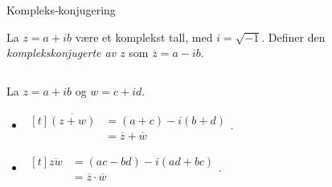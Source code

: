 \documentclass[norsk]{beamer}
\theoremstyle{example}
\begin{document}
\begin{frame}{Kompleks-konjugering}
    \begin{definition}
        La $z = a + ib$ være et komplekst tall, med $i = \sqrt{-1}$.
        Definer den \textit{komplekskonjugerte av $z$} som $\overline z = a - ib$.
    \end{definition}
    \begin{columns}
        \begin{column}{.6\textwidth}
            La $z = a + ib$ og $w = c + id$.
            \begin{itemize}
                \item $\begin{aligned}[t]
                        \overline{(z + w)}
                        &= (a + c) - i(b + d)\\
                        &= \overline z + \overline w
                    \end{aligned}$.
                \pause\item $\begin{aligned}[t]
                        \overline{zw}
                        &= (ac - bd) - i(ad + bc)\\
                        &= \overline{z}\cdot\overline{w}
                    \end{aligned}$.
            \end{itemize}
        \end{column}
        \begin{column}{.4\textwidth}
            \begin{figure}
                \centering
            \end{figure}
        \end{column}
    \end{columns}
\end{frame}
\end{document}
